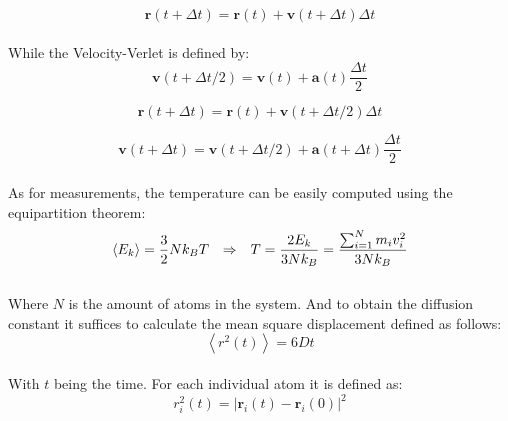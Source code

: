 \documentclass[11pt,a4paper,oneside]{article}
\begin{document}
		\begin{equation*}\mathbf{r}\left(t+\Delta t\right)=\mathbf{r}\left(t\right)+\mathbf{v}\left(t+\Delta t\right)\Delta t\end{equation*}\\
		
		While the Velocity-Verlet is defined by:\\
		
		\begin{equation*}\mathbf{v}\left(t+\Delta t/2\right)=\mathbf{v}\left(t\right)+\mathbf{a}\left(t\right)\frac{\Delta t}{2}\end{equation*}
		
		\begin{equation*}\mathbf{r}\left(t+\Delta t\right)=\mathbf{r}\left(t\right)+\mathbf{v}\left(t+\Delta t/2\right)\Delta t\end{equation*}
		
		\begin{equation*}\mathbf{v}\left(t+\Delta t\right)=\mathbf{v}\left(t+\Delta t/2\right)+\mathbf{a}\left(t+\Delta t\right)\frac{\Delta t}{2}\end{equation*}\\
		
		As for measurements, the temperature can be easily computed using the equipartition theorem:\\
		
		\begin{equation*}\left\langle E_k\right\rangle=\frac{3}{2}Nk_BT\hspace{0.25 cm}\Rightarrow\hspace{0.25 cm}T=\frac{2E_k}{3Nk_B}=\frac{\sum_{i=1}^N{m_iv_i^2}}{3Nk_B}\end{equation*}\\
		
		Where $N$ is the amount of atoms in the system. And to obtain the diffusion constant it suffices to calculate the mean square displacement defined as follows:\\
				
		\begin{equation*}\left\langle r^2\left(t\right)\right\rangle=6Dt\end{equation*}\\
		
		With $t$ being the time. For each individual atom it is defined as:\\
		
		\begin{equation*}r_i^2\left(t\right)=\left|\mathbf{r}_i\left(t\right)-\mathbf{r}_i\left(0\right)\right|^2\end{equation*}\\
		
\end{document}
